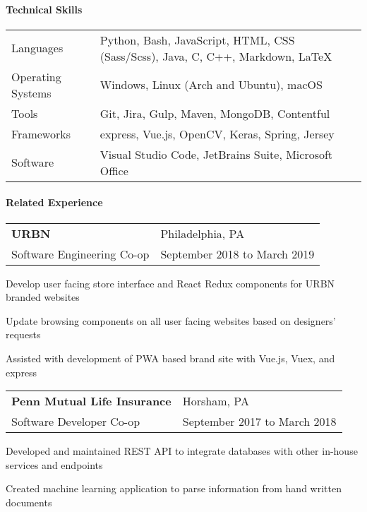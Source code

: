 \documentclass[10pt,]{article}
\let\oldparagraph\paragraph
\renewcommand{\paragraph}[1]{\oldparagraph{#1}\mbox{}}
\begin{document}
\hypertarget{technical-skills}{%
\paragraph{Technical Skills}\label{technical-skills}}

\begin{tabular}{l | l}
    Languages & Python, Bash, JavaScript, HTML, CSS (Sass/Scss), Java, C, C++, Markdown, \LaTeX\\
    Operating Systems     & Windows, Linux (Arch and Ubuntu), macOS\\
    Tools             & Git, Jira, Gulp, Maven, MongoDB, Contentful\\
    Frameworks        & express, Vue.js, OpenCV, Keras, Spring, Jersey\\
    Software          & Visual Studio Code, JetBrains Suite, Microsoft Office
\end{tabular}

\hypertarget{related-experience}{%
\paragraph{Related Experience}\label{related-experience}}

\begin{tabularx}{\textwidth}{l X}
    \textbf{URBN} & \hfill Philadelphia, PA\\
    Software Engineering Co-op        & \hfill September 2018 to March 2019
\end{tabularx}

\begin{list}{\quad}{}
    \item Develop user facing store interface and React Redux components for URBN branded websites
    \item Update browsing components on all user facing websites based on designers' requests
    \item Assisted with development of PWA based brand site with Vue.js, Vuex, and express
\end{list}

\begin{tabularx}{\textwidth}{l X}
    \textbf{Penn Mutual Life Insurance} & \hfill Horsham, PA\\
    Software Developer Co-op        & \hfill September 2017 to March 2018
\end{tabularx}

\begin{list}{\quad}{}
    \item Developed and maintained REST API to integrate databases with other in-house services and endpoints
    \item Created machine learning application to parse information from hand written documents
\end{list}
\end{document}
